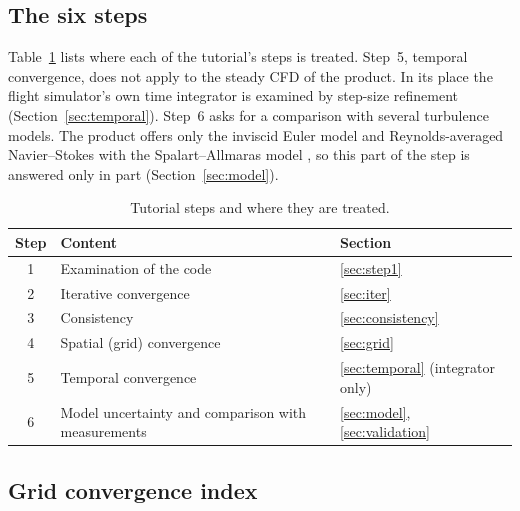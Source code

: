 \documentclass[11pt,a4paper]{article}
\begin{document}
\subsection{The six steps}
\label{sec:steps}

Table~\ref{tab:steps} lists where each of the tutorial's steps is treated.
Step~5, temporal convergence, does not apply to the steady CFD of the product.
In its place the flight simulator's own time integrator is examined by step-size refinement
(Section~\ref{sec:temporal}).
Step~6 asks for a comparison with several turbulence models.
The product offers only the inviscid Euler model and Reynolds-averaged Navier--Stokes with the Spalart--Allmaras
model \citep{spalart1992}, so this part of the step is answered only in part (Section~\ref{sec:model}).

\begin{table}[t]
\centering
\caption{Tutorial steps and where they are treated.}
\label{tab:steps}
\small
\begin{tabular}{@{}cll@{}}
\toprule
Step & Content & Section \\
\midrule
1 & Examination of the code & \ref{sec:step1} \\
2 & Iterative convergence & \ref{sec:iter} \\
3 & Consistency & \ref{sec:consistency} \\
4 & Spatial (grid) convergence & \ref{sec:grid} \\
5 & Temporal convergence & \ref{sec:temporal} (integrator only) \\
6 & Model uncertainty and comparison with measurements & \ref{sec:model}, \ref{sec:validation} \\
\bottomrule
\end{tabular}
\end{table}

\subsection{Grid convergence index}
\label{sec:gci}
\end{document}
